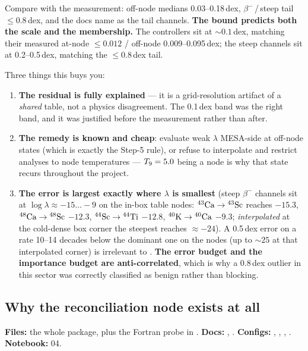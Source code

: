 Compare with the measurement: off-node medians 0.03--0.18\,dex,
$\beta^-$\,/\,steep tail $\le 0.8$\,dex, and the docs name
 as the tail channels. \textbf{The bound
predicts both the scale and the membership.} The \Ye{} controllers sit at
${\sim}0.1$\,dex, matching their measured at-node $\le0.012$ / off-node
0.009--0.095\,dex; the steep channels sit at 0.2--0.5\,dex, matching the
$\le 0.8$\,dex tail.

Three things this buys you:

\begin{enumerate}
\item \textbf{The residual is fully explained} --- it is a grid-resolution
      artifact of a \emph{shared} table, not a physics disagreement. The
      0.1\,dex band was the right band, and it was justified before the
      measurement rather than after.
\item \textbf{The remedy is known and cheap}: evaluate weak $\lambda$ MESA-side
      at off-node states (which is exactly the Step-5 rule), or refuse to
      interpolate and restrict analyses to node temperatures --- $\Tn = 5.0$
      being a node is why that state recurs throughout the project.
\item \textbf{The error is largest exactly where $\lambda$ is smallest} (steep
      $\beta^-$ channels sit at $\log\lambda \approx -15\ldots-9$ on the in-box
      table nodes: $\nuc{Ca}{43}\to\nuc{Sc}{43}$ reaches $-15.3$,
      $\nuc{Ca}{48}\to\nuc{Sc}{48}$ $-12.3$, $\nuc{Sc}{44}\to\nuc{Ti}{44}$
      $-12.8$, $\nuc{K}{40}\to\nuc{Ca}{40}$ $-9.3$; \emph{interpolated} at the
      cold-dense box corner the steepest reaches ${\approx}-24$). A 0.5\,dex
      error on a rate 10--14 decades below the dominant one on the nodes (up to
      ${\sim}25$ at that interpolated corner) is irrelevant to \dYe.
      \textbf{The error budget and the importance budget are anti-correlated},
      which is why a 0.8\,dex outlier in this sector was correctly classified as
      benign rather than blocking.
\end{enumerate}

\subsection{Why the reconciliation node exists at all}
\label{sec:whyS6}

\begin{repopointer}
\textbf{Files:} the whole  package, plus the Fortran probe in
. \quad
\textbf{Docs:} ,
. \quad
\textbf{Configs:} ,
, ,
. \quad
\textbf{Notebook:} 04.
\end{repopointer}

